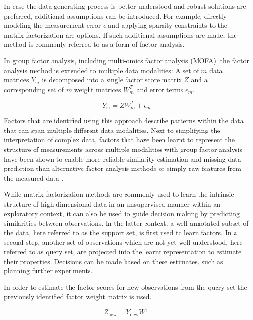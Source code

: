\begin{flushleft}
In case the data generating process is better understood and robust solutions are preferred, additional assumptions can be introduced. For example, directly modeling the measurement error \(\epsilon\) and applying sparsity constraints to the matrix factorization are options. If such additional assumptions are made, the method is commonly referred to as a form of factor analysis.

In group factor analysis, including multi-omics factor analysis (MOFA), the factor analysis method is extended to multiple data modalities: A set of \(m\) data matrices \( Y_m \) is decomposed into a single factor score matrix \( Z \) and a corresponding set of \(m\) weight matrices \( W_m^T \) and error terms \(\epsilon_m\). 

\begin{equation}
    Y_m = ZW_m^T + \epsilon_m
\end{equation}

Factors that are identified using this approach describe patterns within the data that can span multiple different data modalities. Next to simplifying the interpretation of complex data, factors that have been learnt to represent the structure of measurements across multiple modalities with group factor analysis have been shown to enable more reliable similarity estimation and missing data prediction than alternative factor analysis methods or simply raw features from the measured data \citep{Klami}.

While matrix factorization methods are commonly used to learn the intrinsic structure of high-dimensional data in an unsupervised manner within an exploratory context, it can also be used to guide decision making by predicting similarities between observations. In the latter context, a well-annotated subset of the data, here referred to as the support set, is first used to learn factors. In a second step, another set of observations which are not yet well understood, here referred to as query set, are projected into the learnt representation to estimate their properties. Decisions can be made based on these estimates, such as planning further experiments. 

In order to estimate the factor scores for new observations from the query set the previously identified factor weight matrix is used. 

\begin{equation}
    Z_{\text{new}} = Y_{\text{new}} W^+
\end{equation}


\end{flushleft}

